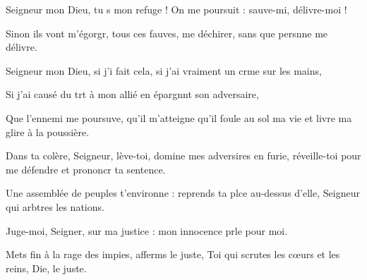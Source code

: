 \item Seigneur mon Dieu, tu s mon refuge !\psstar{} On me poursuit : sauve-mi, délivre-moi !
\item Sinon ils vont m’égorgr, tous ces fauves,\psstar{} me déchirer, sans que persnne me délivre.
\item Seigneur mon Dieu, si j’i fait cela,\psstar{} si j’ai vraiment un crme sur les mains,
\item Si j’ai causé du trt à mon allié\psstar{} en épargnnt son adversaire,
\item Que l’ennemi me poursuve, qu’il m’atteigne\psstar{} qu’il foule au sol ma vie et livre ma glire à la poussière.
\item Dans ta colère, Seigneur, lève-toi,\pscross{} domine mes adversires en furie,\psstar{} réveille-toi pour me défendre et prononcr ta sentence.
\item Une assemblée de peuples t’environne :\pscross{} reprends ta plce au-dessus d’elle,\psstar{} Seigneur qui arbtres les nations.
\item Juge-moi, Seigner, sur ma justice :\psstar{} mon innocence prle pour moi.
\item Mets fin à la rage des impies,\pscross{} afferms le juste,\psstar{} Toi qui scrutes les cœurs et les reins, Die, le juste.